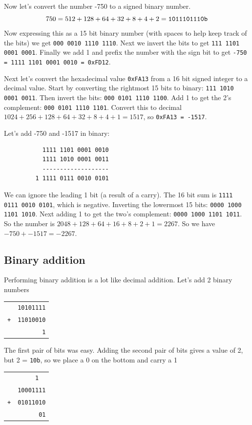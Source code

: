 \documentclass[11pt,b5paper]{book}
\begin{document}
Now let's convert the number -750 to a signed binary number.
$$750 = 512 + 128 + 64 + 32 + 8 + 4 + 2 = {\tt 1011101110b}$$
Now expressing this as a 15 bit binary number (with spaces to help keep track
of the bits) we get {\tt 000 0010 1110 1110}.
Next we invert the bits to get {\tt 111 1101 0001 0001}.
Finally we add 1 and prefix the number with the sign bit to get
{\tt -750 = 1111 1101 0001 0010 = 0xFD12}.

Next let's convert the hexadecimal value {\tt 0xFA13} from a 16 bit signed
integer to a decimal value.
Start by converting the rightmost 15 bits to binary: {\tt 111 1010 0001 0011}.
Then invert the bits: {\tt 000 0101 1110 1100}.
Add 1 to get the 2's complement: {\tt 000 0101 1110 1101}.
Convert this to decimal $1024 + 256 + 128 + 64 + 32 + 8 + 4 + 1 = 1517$,
so {\tt 0xFA13 = -1517}.

Let's add -750 and -1517 in binary:
\begin{verbatim}
           1111 1101 0001 0010
           1111 1010 0001 0011
           -------------------
         1 1111 0111 0010 0101
\end{verbatim}
We can ignore the leading 1 bit (a result of a carry).
The 16 bit sum is {\tt 1111 0111 0010 0101}, which is negative.
Inverting the lowermost 15 bits: {\tt 0000 1000 1101 1010}.
Next adding 1 to get the two's complement: {\tt 0000 1000 1101 1011}.
So the number is $2048 + 128 + 64 + 16 + 8 + 2 + 1 = 2267$.
So we have $-750 + -1517 = -2267$.

\subsection{Binary addition}

Performing binary addition is a lot like decimal addition.
Let's add 2 binary numbers

\begin{center}
\begin{tabular}{cr}
         & {\tt 10101111} \\
 {\tt +} & {\tt 11010010} \\
\hline
         & {\tt 1}
\end{tabular}
\end{center}

The first pair of bits was easy.
Adding the second pair of bits gives a value of 2, but 2 = {\tt 10b}, so we
place a 0 on the bottom and carry a 1

\begin{center}
\begin{tabular}{cr}
         & {\tt 1\ \ } \\
         & {\tt 10001111} \\
 {\tt +} & {\tt 01011010} \\
\hline
         & {\tt 01}
\end{tabular}
\end{center}
\end{document}
